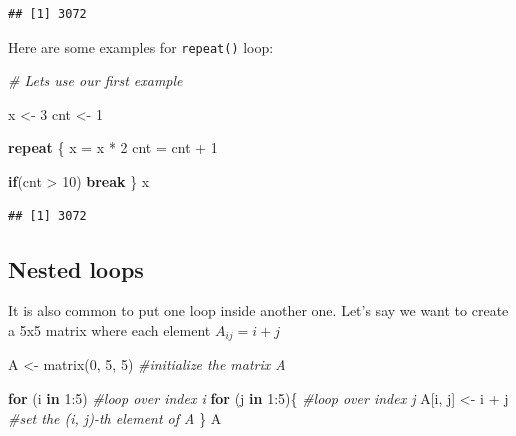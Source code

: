 \documentclass[
]{book}
\newenvironment{Shaded}{\begin{snugshade}}{\end{snugshade}}
\newcommand{\CommentTok}[1]{\textcolor[rgb]{0.56,0.35,0.01}{\textit{#1}}}
\newcommand{\ControlFlowTok}[1]{\textcolor[rgb]{0.13,0.29,0.53}{\textbf{#1}}}
\newcommand{\DecValTok}[1]{\textcolor[rgb]{0.00,0.00,0.81}{#1}}
\newcommand{\FunctionTok}[1]{\textcolor[rgb]{0.00,0.00,0.00}{#1}}
\newcommand{\NormalTok}[1]{#1}
\newcommand{\OtherTok}[1]{\textcolor[rgb]{0.56,0.35,0.01}{#1}}
\newcommand{\SpecialCharTok}[1]{\textcolor[rgb]{0.00,0.00,0.00}{#1}}
\begin{document}
\begin{verbatim}
## [1] 3072
\end{verbatim}

Here are some examples for \texttt{repeat()} loop:

\begin{Shaded}
\begin{Highlighting}[]
\CommentTok{\# Let\textquotesingle{}s use our first example}

\NormalTok{x }\OtherTok{\textless{}{-}} \DecValTok{3}
\NormalTok{cnt }\OtherTok{\textless{}{-}} \DecValTok{1}

\ControlFlowTok{repeat}\NormalTok{ \{}
\NormalTok{   x }\OtherTok{=}\NormalTok{ x }\SpecialCharTok{*} \DecValTok{2}
\NormalTok{   cnt }\OtherTok{=}\NormalTok{ cnt }\SpecialCharTok{+} \DecValTok{1}
  
   \ControlFlowTok{if}\NormalTok{(cnt }\SpecialCharTok{\textgreater{}} \DecValTok{10}\NormalTok{) }\ControlFlowTok{break}
\NormalTok{\}}
\NormalTok{x}
\end{Highlighting}
\end{Shaded}

\begin{verbatim}
## [1] 3072
\end{verbatim}

\hypertarget{nested-loops}{%
\subsection{Nested loops}\label{nested-loops}}

It is also common to put one loop inside another one. Let's say we want to create a 5x5 matrix where each element \(A_{i j}=i+j\)

\begin{Shaded}
\begin{Highlighting}[]
\NormalTok{A }\OtherTok{\textless{}{-}} \FunctionTok{matrix}\NormalTok{(}\DecValTok{0}\NormalTok{, }\DecValTok{5}\NormalTok{, }\DecValTok{5}\NormalTok{) }\CommentTok{\#initialize the matrix A}

\ControlFlowTok{for}\NormalTok{ (i }\ControlFlowTok{in} \DecValTok{1}\SpecialCharTok{:}\DecValTok{5}\NormalTok{)       }\CommentTok{\#loop over index i}
  \ControlFlowTok{for}\NormalTok{ (j }\ControlFlowTok{in} \DecValTok{1}\SpecialCharTok{:}\DecValTok{5}\NormalTok{)\{    }\CommentTok{\#loop over index j}
\NormalTok{    A[i, j] }\OtherTok{\textless{}{-}}\NormalTok{ i }\SpecialCharTok{+}\NormalTok{ j }\CommentTok{\#set the (i, j){-}th element of A}
\NormalTok{  \}}
\NormalTok{A}
\end{Highlighting}
\end{Shaded}
\end{document}
